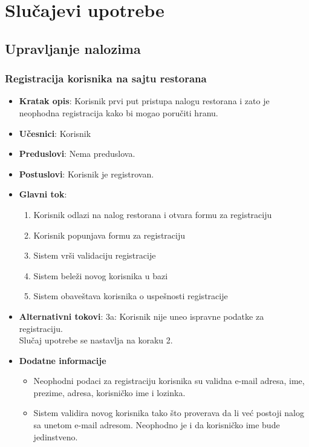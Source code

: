 \newpage
\section{Slu\v cajevi upotrebe}
\subsection{Upravljanje nalozima}
\subsubsection{Registracija korisnika na sajtu restorana}
\begin{itemize}
    \item \textbf{Kratak opis}:
    Korisnik prvi put pristupa nalogu restorana i zato je neophodna registracija kako bi mogao poručiti hranu.
    \item \textbf{Učesnici}:
    Korisnik
    \item \textbf{Preduslovi}:
    Nema preduslova. 
    \item \textbf{Postuslovi}:
    Korisnik je registrovan. 
    \item \textbf{Glavni tok}:
   \begin{enumerate}
        \item Korisnik odlazi na nalog restorana i otvara formu za registraciju
        \item Korisnik popunjava formu za registraciju
        \item Sistem vrši validaciju registracije
        \item Sistem beleži novog korisnika u bazi
        \item Sistem obaveštava korisnika o uspešnosti registracije
\end{enumerate}
\end{itemize}
\begin {itemize}
\item \textbf {Alternativni tokovi}: 
 3a: Korisnik nije uneo ispravne podatke za registraciju.\\
 Slučaj upotrebe se nastavlja na koraku 2.
 \end{itemize}
 \begin{itemize} 
     \item \textbf{Dodatne informacije}
 \begin{itemize}
     \item Neophodni podaci za registraciju korisnika su validna e-mail adresa, ime, prezime, adresa, korisničko ime i lozinka.
    \item Sistem validira novog korisnika tako što proverava da li već postoji nalog sa unetom e-mail adresom. Neophodno je i da korisničko ime bude jedinstveno.
 \end{itemize}
 \end{itemize}
 
